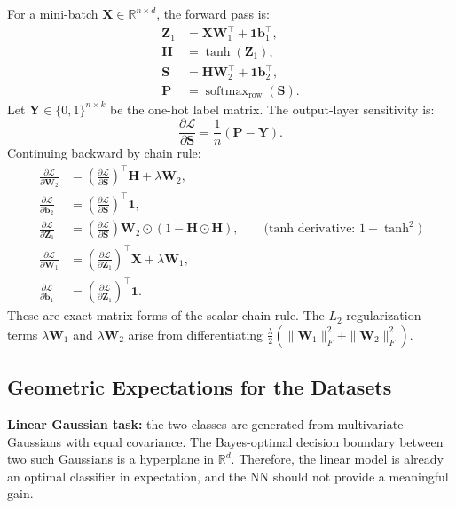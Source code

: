 \documentclass[11pt]{article}
\newcommand{\R}{\mathbb{R}}
\newcommand{\loss}{\mathcal{L}}
\newcommand{\softmax}{\operatorname{softmax}}
\newcommand{\mX}{\mathbf{X}}
\newcommand{\mY}{\mathbf{Y}}
\newcommand{\mH}{\mathbf{H}}
\newcommand{\mP}{\mathbf{P}}
\newcommand{\mS}{\mathbf{S}}
\newcommand{\mZ}{\mathbf{Z}}
\newcommand{\vone}{\mathbf{1}}
\begin{document}
For a mini-batch $\mX \in \R^{n \times d}$, the forward pass is:
\begin{align}
    \mZ_1 &= \mX \mathbf{W}_1^\top + \vone \mathbf{b}_1^\top, \\
    \mH   &= \tanh(\mZ_1), \\
    \mS   &= \mH \mathbf{W}_2^\top + \vone \mathbf{b}_2^\top, \\
    \mP   &= \softmax_\text{row}(\mS).
\end{align}
Let $\mY \in \{0,1\}^{n \times k}$ be the one-hot label matrix.
The output-layer sensitivity is:
\begin{equation}
    \frac{\partial \loss}{\partial \mS} = \frac{1}{n}(\mP - \mY).
\end{equation}
Continuing backward by chain rule:
\begin{align}
    \frac{\partial \loss}{\partial \mathbf{W}_2} &=
        \left(\frac{\partial \loss}{\partial \mS}\right)^\top \mH
        + \lambda \mathbf{W}_2, \\[4pt]
    \frac{\partial \loss}{\partial \mathbf{b}_2} &=
        \left(\frac{\partial \loss}{\partial \mS}\right)^\top \vone, \\[4pt]
    \frac{\partial \loss}{\partial \mZ_1} &=
        \left(\frac{\partial \loss}{\partial \mS}\right) \mathbf{W}_2
        \odot (1 - \mH \odot \mH),
        \qquad \text{(tanh derivative: } 1-\tanh^2\text{)}\\[4pt]
    \frac{\partial \loss}{\partial \mathbf{W}_1} &=
        \left(\frac{\partial \loss}{\partial \mZ_1}\right)^\top \mX
        + \lambda \mathbf{W}_1, \\[4pt]
    \frac{\partial \loss}{\partial \mathbf{b}_1} &=
        \left(\frac{\partial \loss}{\partial \mZ_1}\right)^\top \vone.
\end{align}
These are exact matrix forms of the scalar chain rule.
The $L_2$ regularization terms $\lambda\mathbf{W}_1$ and $\lambda\mathbf{W}_2$ arise
from differentiating $\tfrac{\lambda}{2}(\|\mathbf{W}_1\|_F^2 + \|\mathbf{W}_2\|_F^2)$.

\subsection{Geometric Expectations for the Datasets}

\textbf{Linear Gaussian task:} the two classes are generated from multivariate Gaussians
with equal covariance.
The Bayes-optimal decision boundary between two such Gaussians is a hyperplane in $\R^d$.
Therefore, the linear model is already an optimal classifier in expectation, and the NN
should not provide a meaningful gain.
\end{document}
